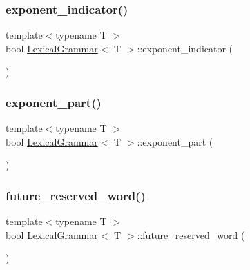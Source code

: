 \mbox{\label{class_lexical_grammar_a45135be3081ddcdbb776555a6819d45f}} 
\subsubsection{\texorpdfstring{exponent\+\_\+indicator()}{exponent\_indicator()}}
{\footnotesize\ttfamily template$<$typename T $>$ \\
bool \hyperlink{class_lexical_grammar}{Lexical\+Grammar}$<$ T $>$\+::exponent\+\_\+indicator (\begin{DoxyParamCaption}{ }\end{DoxyParamCaption})\hspace{0.3cm}{\ttfamily [inline]}}

\mbox{\label{class_lexical_grammar_a295f7a8841c4b098113e0a43401488fc}} 
\subsubsection{\texorpdfstring{exponent\+\_\+part()}{exponent\_part()}}
{\footnotesize\ttfamily template$<$typename T $>$ \\
bool \hyperlink{class_lexical_grammar}{Lexical\+Grammar}$<$ T $>$\+::exponent\+\_\+part (\begin{DoxyParamCaption}{ }\end{DoxyParamCaption})\hspace{0.3cm}{\ttfamily [inline]}}

\mbox{\label{class_lexical_grammar_a588be2892f65d3367dfd049174532c17}} 
\subsubsection{\texorpdfstring{future\+\_\+reserved\+\_\+word()}{future\_reserved\_word()}}
{\footnotesize\ttfamily template$<$typename T $>$ \\
bool \hyperlink{class_lexical_grammar}{Lexical\+Grammar}$<$ T $>$\+::future\+\_\+reserved\+\_\+word (\begin{DoxyParamCaption}{ }\end{DoxyParamCaption})\hspace{0.3cm}{\ttfamily [inline]}}

